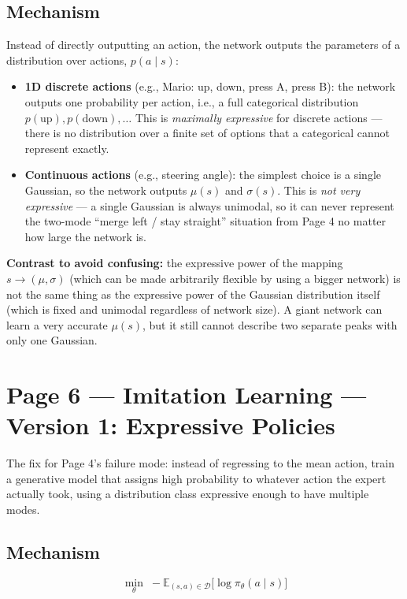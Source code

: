 \documentclass[11pt]{article}
\begin{document}
\subsection*{Mechanism}

Instead of directly outputting an action, the network outputs the parameters of a distribution over actions, $p(a \mid s)$:
\begin{itemize}
\item \textbf{1D discrete actions} (e.g., Mario: up, down, press A, press B): the network outputs one probability per action, i.e., a full categorical distribution $p(\text{up}), p(\text{down}), \dots$ This is \emph{maximally expressive} for discrete actions --- there is no distribution over a finite set of options that a categorical cannot represent exactly.
\item \textbf{Continuous actions} (e.g., steering angle): the simplest choice is a single Gaussian, so the network outputs $\mu(s)$ and $\sigma(s)$. This is \emph{not very expressive} --- a single Gaussian is always unimodal, so it can never represent the two-mode ``merge left / stay straight'' situation from Page 4 no matter how large the network is.
\end{itemize}

\textbf{Contrast to avoid confusing:} the expressive power of the mapping $s \to (\mu, \sigma)$ (which can be made arbitrarily flexible by using a bigger network) is not the same thing as the expressive power of the Gaussian distribution itself (which is fixed and unimodal regardless of network size). A giant network can learn a very accurate $\mu(s)$, but it still cannot describe two separate peaks with only one Gaussian.

\section*{Page 6 --- Imitation Learning --- Version 1: Expressive Policies}

The fix for Page 4's failure mode: instead of regressing to the mean action, train a generative model that assigns high probability to whatever action the expert actually took, using a distribution class expressive enough to have multiple modes.

\subsection*{Mechanism}

\[
\min_\theta \; -\mathbb{E}_{(s,a)\in\mathcal{D}}\big[\log \pi_\theta(a\mid s)\big]
\]
\end{document}
